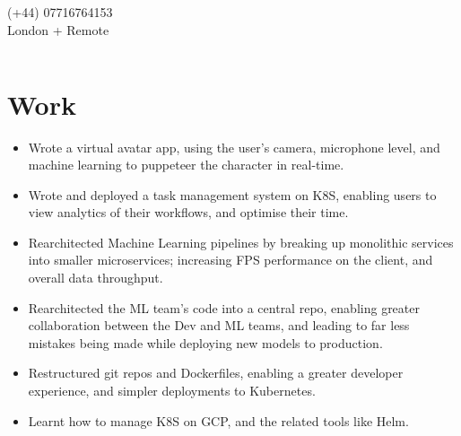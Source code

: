 \documentclass{jcgcv}
\begin{document}
\fontsize{8pt}{1.15em}
\selectfont
{}

\begin{column}


\end{column}\begin{column}

  \fixTop
  \begin{flushright}
    \\
    \\
    (+44) 07716764153\\
    London + Remote\\
  \end{flushright}

\end{column}\begin{column}

\section{Work}
  \begin{itemize}
    \item Wrote a virtual avatar app, using the user's camera, microphone level,
          and machine learning to puppeteer the character in real-time.
    \item Wrote and deployed a task management system on K8S, enabling
          users to view analytics of their workflows, and optimise their time.
  \end{itemize}

  \begin{itemize}
    \item Rearchitected Machine Learning pipelines by breaking up monolithic
          services into smaller microservices; increasing FPS performance on
          the client, and overall data throughput.
    \item Rearchitected the ML team's code into a central repo, enabling greater
          collaboration between the Dev and ML teams, and leading to far less
          mistakes being made while deploying new models to production.
    \item Restructured git repos and Dockerfiles, enabling a greater developer
          experience, and simpler deployments to Kubernetes.
    \item Learnt how to manage K8S on GCP, and the related tools like Helm.
  \end{itemize}


\end{column}
\end{document}
